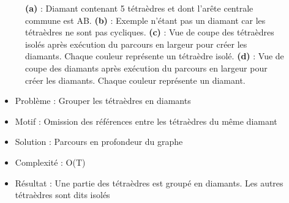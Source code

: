 \documentclass[9pt]{beamer}
\begin{document}
\begin{frame}
\begin{figure}[H]
\begin{subfigure}{.24\textwidth}
  \caption{}
\end{subfigure}
\caption{\textbf{(a)} : Diamant contenant 5 tétraèdres et dont l'arête centrale commune est AB. \textbf{(b)} : Exemple n'étant pas un diamant car les tétraèdres ne sont pas cycliques. \textbf{(c)} : Vue de coupe des tétraèdres isolés après exécution du parcours en largeur pour créer les diamants. Chaque couleur représente un tétraèdre isolé. \textbf{(d)} : Vue de coupe des diamants après exécution du parcours en largeur pour créer les diamants. Chaque couleur représente un diamant.}
\end{figure}
\begin{block}{}
\begin{itemize}
\item Problème : Grouper les tétraèdres en diamants
\item Motif : Omission des références entre les tétraèdres du même diamant
\item Solution : Parcours en profondeur du graphe
\item Complexité : O(T)
\item Résultat : Une partie des tétraèdres est groupé en diamants. Les autres tétraèdres sont dits isolés
\end{itemize}
\end{block}
\end{frame}
\end{document}
